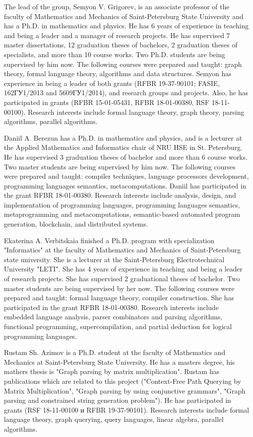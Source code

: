 \documentclass[12pt]{article}  %
\theoremstyle{remark}
\begin{document}
The lead of the group, Semyon V. Grigorev, is an associate professor of the faculty of Mathematics and Mechanics of Saint-Petersburg State University and has a Ph.D. in mathematics and physics. He has 6 years of experience in teaching and being a leader and a manager of research projects. He has supervised 7 master dissertations, 12 graduation theses of bachelors, 2 graduation theses of specialists, and more than 10 course works. Two Ph.D. students are being supervised by him now. The following courses were prepared and taught: graph theory, formal language theory, algorithms and data structures. Semyon has experience in being a leader of both grants  (RFBR 19-37-90101; FASIE, 162ГУ1/2013 and 5609ГУ1/2014), and research groups and projects. Also, he has participated in grants (RFBR 15-01-05431, RFBR 18-01-00380, RSF 18-11-00100). Research interests include formal language theory, graph theory, parsing algorithms, parallel algorithms.

Daniil A. Berezun has a Ph.D. in mathematics and physics, and is a lecturer at the Applied Mathematics and Informatics chair of NRU HSE in St. Petersburg. He has supervised 3 graduation theses of bachelor and more than 6 course works. Two master students are being supervised by him now. The following courses were prepared and taught: compiler techniques, language processors development, programming languages semantics, metacomputations. Daniil has participated in the grant RFBR 18-01-00380. Research interests include analysis, design, and implementation of programming languages, programming languages semantics, metaprogramming and metacomputations, semantic-based automated program generation, blockchain, and distributed systems.

Ekaterina A. Verbitskaia finished a Ph.D. program with specialization "Informatics" at the faculty of Mathematics and Mechanics of Saint-Petersburg state university. She is a lecturer at the Saint-Petersburg Electrotechnical University "LETI". She has 4 years of experience in teaching and being a leader of research projects. She has supervised 2 graduational theses of bachelor. Two master students are being supervised by her now. The following courses were prepared and taught: formal language theory, compiler construction. She has participated in the grant RFBR 18-01-00380. Research interests include embedded language analysis, parser combinators and parsing algorithms, functional programming, supercompilation, and partial deduction for logical programming languages.

Rustam Sh. Azimov is a Ph.D. student at the faculty of Mathematics and Mechanics at Saint-Petersburg State University. He has a masters degree, his mathers thesis is "Graph parsing by matrix multiplication". Rustam has publications which are related to this project ("Context-Free Path Querying by Matrix Multiplication", "Graph parsing by using conjunctive grammars", "Graph parsing and constrained string generation problem"). He has participated in grants (RSF 18-11-00100 и RFBR 19-37-90101). Research interests include formal language theory, graph querying, query languages, linear algebra, parallel algorithms.
\end{document}
